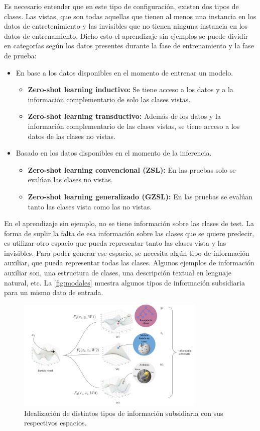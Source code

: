 Es necesario entender que en este tipo de configuración, existen dos tipos de clases. Las vistas, que son todas aquellas que tienen al menos una instancia en los datos de entretenimiento y las invisibles que no tienen ninguna instancia en los datos de entrenamiento. Dicho esto el aprendizaje sin ejemplos se puede dividir en categorías según los datos presentes durante la fase de entrenamiento y la fase de prueba:
\begin{itemize}
	\item En base a los datos disponibles en el momento de entrenar un modelo.
	\begin{itemize}
		\item \textbf{Zero-shot learning inductivo:} Se tiene acceso a los datos y a la información complementario de solo las clases vistas.
		\item \textbf{Zero-shot learning transductivo:} Además de los datos y la información complementario de las clases vistas,  se tiene acceso a los datos de las clases no vistas.
	\end{itemize}
	\item Basado en los datos disponibles en el momento de la inferencia.
	\begin{itemize}
		\item \textbf{Zero-shot learning convencional (ZSL):} En las pruebas solo se evalúan las clases no vistas.
		\item \textbf{Zero-shot learning generalizado (GZSL):} En las pruebas se evalúan tanto las clases vista como las no vistas.
	\end{itemize}
\end{itemize}

En el aprendizaje sin ejemplo, no se tiene información sobre las clases de test. La forma de suplir la falta de esa información sobre las clases que se quiere predecir, es utilizar otro espacio que pueda representar tanto las clases vista y las invisibles. Para poder generar ese espacio, se necesita algún tipo de información auxiliar, que pueda representar todas las clases.
Algunos ejemplos de información auxiliar son, una estructura de clases, una descripción textual en lenguaje natural, etc. La \autoref{fig:modales} muestra algunos tipos de información subsidiaria para un mismo dato de entrada.

\begin{figure}[]
	\centering
	\includegraphics[width=0.8\textwidth]{img/modales.png}
	\caption{Idealización de distintos tipos de información subsidiaria con sus respectivos espacios.}
	\label{fig:modales}
\end{figure}

